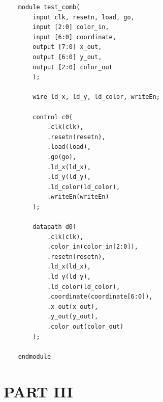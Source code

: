 \documentclass{article}
\begin{document}
\begin{verbatim}
    module test_comb(
        input clk, resetn, load, go,
        input [2:0] color_in,
        input [6:0] coordinate,
        output [7:0] x_out,
        output [6:0] y_out,
        output [2:0] color_out
        );

        wire ld_x, ld_y, ld_color, writeEn;

        control c0(
            .clk(clk),
            .resetn(resetn),
            .load(load),
            .go(go),
            .ld_x(ld_x),
            .ld_y(ld_y),
            .ld_color(ld_color),
            .writeEn(writeEn)	
        );

        datapath d0(
            .clk(clk),
            .color_in(color_in[2:0]),
            .resetn(resetn),
            .ld_x(ld_x),
            .ld_y(ld_y),
            .ld_color(ld_color),
            .coordinate(coordinate[6:0]),
            .x_out(x_out),
            .y_out(y_out),
            .color_out(color_out)
        );
        
    endmodule
\end{verbatim}

\section*{PART III}
\end{document}
